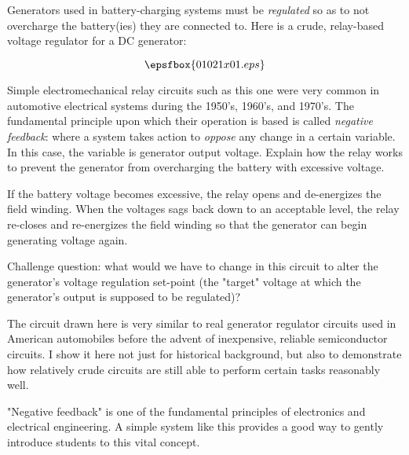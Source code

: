

Generators used in battery-charging systems must be {\it regulated} so as to not overcharge the battery(ies) they are connected to.  Here is a crude, relay-based voltage regulator for a DC generator:

$$\epsfbox{01021x01.eps}$$

Simple electromechanical relay circuits such as this one were very common in automotive electrical systems during the 1950's, 1960's, and 1970's.  The fundamental principle upon which their operation is based is called {\it negative feedback}: where a system takes action to {\it oppose} any change in a certain variable.  In this case, the variable is generator output voltage.  Explain how the relay works to prevent the generator from overcharging the battery with excessive voltage.







If the battery voltage becomes excessive, the relay opens and de-energizes the field winding.  When the voltages sags back down to an acceptable level, the relay re-closes and re-energizes the field winding so that the generator can begin generating voltage again.

\vskip 10pt

Challenge question: what would we have to change in this circuit to alter the generator's voltage regulation set-point (the "target" voltage at which the generator's output is supposed to be regulated)?







The circuit drawn here is very similar to real generator regulator circuits used in American automobiles before the advent of inexpensive, reliable semiconductor circuits.  I show it here not just for historical background, but also to demonstrate how relatively crude circuits are still able to perform certain tasks reasonably well.

"Negative feedback" is one of the fundamental principles of electronics and electrical engineering.  A simple system like this provides a good way to gently introduce students to this vital concept.




